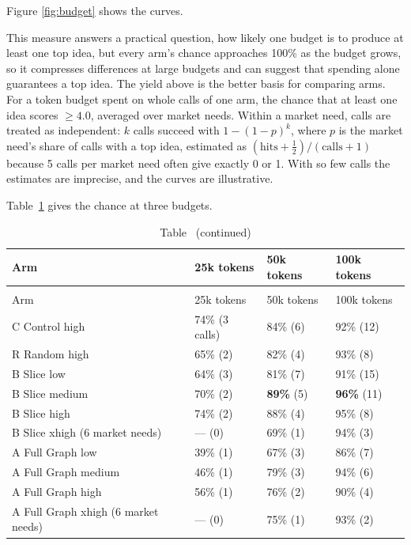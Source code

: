 Figure \ref{fig:budget} shows the curves.

This measure answers a practical question, how likely one budget is to produce at least one top idea, but every arm's chance approaches 100\% as the budget grows, so it compresses differences at large budgets and can suggest that spending alone guarantees a top idea. The yield above is the better basis for comparing arms. For a token budget spent on whole calls of one arm, the chance that at least one idea scores $\ge 4.0$, averaged over market needs. Within a market need, calls are treated as independent: $k$ calls succeed with $1 - (1 - p)^k$, where $p$ is the market need's share of calls with a top idea, estimated as $(\text{hits} + \tfrac{1}{2}) / (\text{calls} + 1)$ because 5 calls per market need often give exactly 0 or 1. With so few calls the estimates are imprecise, and the curves are illustrative.

Table~\ref{tab:budget} gives the chance at three budgets.

\begin{longtable}[]{@{}llll@{}}
\caption{Chance of at least one top idea for a given token budget, per arm. In brackets: the number of whole calls that budget buys.}\label{tab:budget}\tabularnewline
\toprule\noalign{}
Arm & 25k tokens & 50k tokens & 100k tokens \\
\midrule\noalign{}
\endfirsthead
\caption*{Table~\thetable{} (continued)}\tabularnewline
\toprule\noalign{}
Arm & 25k tokens & 50k tokens & 100k tokens \\
\midrule\noalign{}
\endhead
\bottomrule\noalign{}
\endlastfoot
C \textperiodcentered{} Control \textperiodcentered{} high & 74\% (3 calls) & 84\% (6) & 92\% (12) \\
R \textperiodcentered{} Random \textperiodcentered{} high & 65\% (2) & 82\% (4) & 93\% (8) \\
B \textperiodcentered{} Slice \textperiodcentered{} low & 64\% (3) & 81\% (7) & 91\% (15) \\
B \textperiodcentered{} Slice \textperiodcentered{} medium & 70\% (2) & \textbf{89\%} (5) & \textbf{96\%} (11) \\
B \textperiodcentered{} Slice \textperiodcentered{} high & 74\% (2) & 88\% (4) & 95\% (8) \\
B \textperiodcentered{} Slice \textperiodcentered{} xhigh (6 market needs) & --- (0) & 69\% (1) & 94\% (3) \\
A \textperiodcentered{} Full Graph \textperiodcentered{} low & 39\% (1) & 67\% (3) & 86\% (7) \\
A \textperiodcentered{} Full Graph \textperiodcentered{} medium & 46\% (1) & 79\% (3) & 94\% (6) \\
A \textperiodcentered{} Full Graph \textperiodcentered{} high & 56\% (1) & 76\% (2) & 90\% (4) \\
A \textperiodcentered{} Full Graph \textperiodcentered{} xhigh (6 market needs) & --- (0) & 75\% (1) & 93\% (2) \\
\end{longtable}

